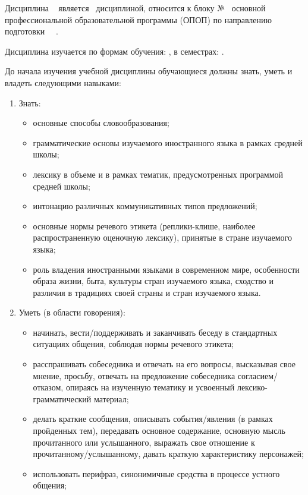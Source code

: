 Дисциплина \DisciplineName~ является \DisciplineNeed~дисциплиной, относится к блоку №\BlockCode~ основной профессиональной образовательной программы (ОПОП) по направлению подготовки \SpecialityCode~\SpecialityName~\OrganizationShortName.

Дисциплина изучается по формам обучения: \FormOfStudy, в семестрах: \SemestryList.

До начала изучения учебной дисциплины обучающиеся должны знать, уметь и владеть следующими навыками:
\begin{enumerate}
\item Знать:
	\begin{itemize}
	\item основные способы словообразования;
	\item грамматические основы изучаемого иностранного языка в рамках средней школы;
	\item лексику в объеме и в рамках тематик, предусмотренных программой средней школы;
	\item интонацию различных коммуникативных типов предложений;
	\item основные нормы речевого этикета (реплики-клише, наиболее распространенную оценочную лексику), принятые в стране изучаемого языка;
	\item роль владения иностранными языками в современном мире, особенности образа жизни, быта, культуры стран изучаемого языка, сходство и различия в традициях своей страны и стран изучаемого языка.	
	\end{itemize}
\item Уметь (в области говорения):
	\begin{itemize}
	\item начинать, вести/поддерживать и заканчивать беседу в стандартных ситуациях общения, соблюдая нормы речевого этикета;
	\item расспрашивать собеседника и отвечать на его вопросы, высказывая свое мнение, просьбу, отвечать на предложение собеседника согласием/отказом, опираясь на изученную тематику и усвоенный лексико-грамматический материал;
	\item делать краткие сообщения, описывать события/явления (в рамках пройденных тем), передавать основное содержание, основную мысль прочитанного или услышанного, выражать свое отношение к прочитанному/услышанному, давать краткую характеристику персонажей;
	\item использовать перифраз, синонимичные средства в процессе устного общения;
	\end{itemize}

\end{enumerate}
